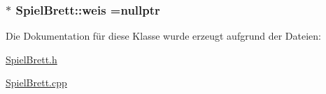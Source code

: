 \subsubsection[{weis}]{ $\ast$ Spiel\+Brett\+::weis =nullptr\hspace{0.3cm}{\ttfamily [private]}}\label{class_spiel_brett_aa5c83f7c16af3ea1c51d2ea9745875ac}


Die Dokumentation für diese Klasse wurde erzeugt aufgrund der Dateien\+:\begin{DoxyCompactItemize}
\item 
\hyperlink{_spiel_brett_8h}{Spiel\+Brett.\+h}\item 
\hyperlink{_spiel_brett_8cpp}{Spiel\+Brett.\+cpp}\end{DoxyCompactItemize}
